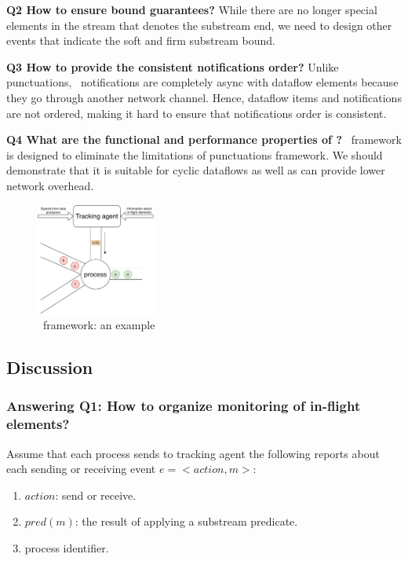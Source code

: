 {\bf Q2 How to ensure bound guarantees?} While there are no longer special elements in the stream that denotes the substream end, we need to design other events that indicate the soft and firm substream bound. 

{\bf Q3 How to provide the consistent notifications order?} Unlike punctuations, \tracker\ notifications are completely async with dataflow elements because they go through another network channel. Hence, dataflow items and notifications are not ordered, making it hard to ensure that notifications order is consistent.

{\bf Q4 What are the functional and performance properties of \tracker?} \tracker\ framework is designed to eliminate the limitations of punctuations framework. We should demonstrate that it is suitable for cyclic dataflows as well as can provide lower network overhead.

\begin{figure}[htbp]
  \centering
  \includegraphics[width=0.35\textwidth]{pics/tracker-scheme.pdf}
  \caption{\tracker\ framework: an example}
  \label{tracker_scheme}
\end{figure}

\subsection{Discussion}

\subsubsection{Answering Q1: How to organize monitoring of in-flight elements?}
Assume that each process sends to tracking agent the following reports about each sending or receiving event $e = <action,m>$:
\begin{enumerate}
    \item $action$: send or receive.
    \item $pred(m)$: the result of applying a substream predicate.
    \item process identifier.
\end{enumerate}

